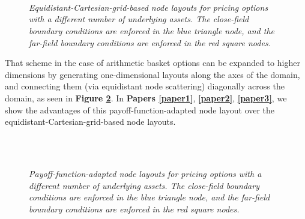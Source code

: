 \documentclass{UUThesisTemplate}
\begin{document}
\begin{figure}[H]
\centering
\\
\vspace{11pt}
\\
\vspace{11pt}
\\
\caption{\emph{Equidistant-Cartesian-grid-based node layouts for pricing options with a different number of underlying assets. The close-field boundary conditions are enforced in the blue triangle node, and the far-field boundary conditions are enforced in the red square nodes.}}
\label{fig:gridreg}
\end{figure}
\noindent That scheme in the case of arithmetic basket options can be expanded to higher dimensions by generating one-dimensional layouts along the axes of the domain, and connecting them (via equidistant node scattering) diagonally across the domain, as seen in \textbf{Figure \ref{fig:gridadap}}. In \textbf{Papers \ref{paper1}}, \textbf{\ref{paper2}}, \textbf{\ref{paper3}}, we show the advantages of this payoff-function-adapted node layout over the equidistant-Cartesian-grid-based node layouts.   

\begin{figure}[H]
\centering
\\
\vspace{11pt}
\\
\caption{\emph{Payoff-function-adapted node layouts for pricing options with a different number of underlying assets. The close-field boundary conditions are enforced in the blue triangle node, and the far-field boundary conditions are enforced in the red square nodes.}}
\label{fig:gridadap}
\end{figure}
\end{document}
